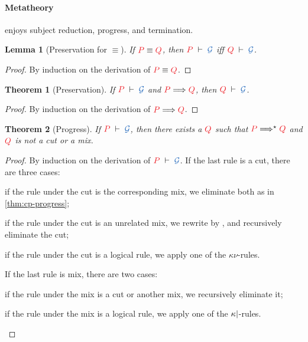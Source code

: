\documentclass[draft,submission,copyright,creativecommons]{eptcs}
\newtheorem{lemma}{Lemma}
\newtheorem{theorem}{Theorem}
\begin{document}
\paragraph{Metatheory}
\hcp enjoys subject reduction, progress, and termination.
\begin{lemma}[Preservation for $\equiv$]\label{lem:hcp-preservation-equiv}
  If $\tm{P}\equiv\tm{Q}$, then $\seq[P]{\mathcal{G}}$ iff $\seq[Q]{\mathcal{G}}$.
\end{lemma}\vspace*{-0.75\baselineskip}%
\begin{proof}
  By induction on the derivation of $\tm{P}\equiv\tm{Q}$.
\end{proof}\vspace*{-0.75\baselineskip}%
\begin{theorem}[Preservation]\label{thm:hcp-preservation}
  If $\seq[P]{\mathcal{G}}$ and $\reducesto{P}{Q}$, then $\seq[Q]{\mathcal{G}}$.
\end{theorem}\vspace*{-0.75\baselineskip}%
\begin{proof}
  By induction on the derivation of $\reducesto{P}{Q}$.
\end{proof}\vspace*{-0.75\baselineskip}%
\begin{theorem}[Progress]\label{thm:hcp-progress}
  If $\seq[P]{\mathcal{G}}$, then there exists a $\tm{Q}$ such that
  $\tm{P}\Longrightarrow^\star\tm{Q}$ and $\tm{Q}$ is not a cut or a mix.
\end{theorem}\vspace*{-0.75\baselineskip}%
\begin{proof}
  By induction on the derivation of $\seq[P]{\mathcal{G}}$.
  If the last rule is a cut, there are three cases:
  \begin{enumerate*}[label={\alph*)}]
  \item
    if the rule under the cut is the corresponding mix, we eliminate both as in
    \cref{thm:cp-progress};
  \item
    if the rule under the cut is an unrelated mix, we rewrite by
    \hccpEquivScopeExt{}, and recursively eliminate the cut;
  \item
    if the rule under the cut is a logical rule, we apply one of the
    $\kappa\nu$-rules.
  \end{enumerate*}
  If the last rule is mix, there are two cases:
  \begin{enumerate*}[label={\alph*)}]
  \item
    if the rule under the mix is a cut or another mix, we recursively eliminate it;
  \item
    if the rule under the mix is a logical rule, we apply one of the
    $\kappa{\ensuremath{\mid}}$-rules.
  \end{enumerate*}
\end{proof}\vspace*{-0.75\baselineskip}%
\end{document}
